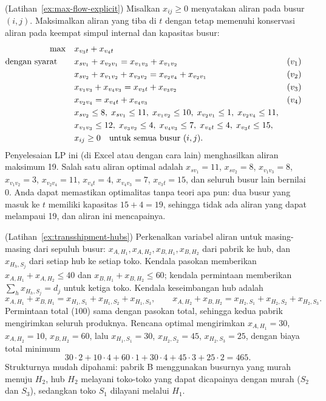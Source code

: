 \begin{solution}(Latihan~\ref{ex:max-flow-explicit})
Misalkan $x_{ij} \geq 0$ menyatakan aliran pada busur $(i,j)$. Maksimalkan aliran yang tiba di $t$ dengan tetap memenuhi konservasi aliran pada keempat simpul internal dan kapasitas busur:
\begin{align*}
\max \quad & x_{v_3 t} + x_{v_4 t}\\
\mbox{dengan syarat}\quad \quad & x_{s v_1} + x_{v_2 v_1} = x_{v_1 v_3} + x_{v_1 v_2} && (v_1)\\
& x_{s v_2} + x_{v_1 v_2} + x_{v_3 v_2} = x_{v_2 v_4} + x_{v_2 v_1} && (v_2)\\
& x_{v_1 v_3} + x_{v_4 v_3} = x_{v_3 t} + x_{v_3 v_2} && (v_3)\\
& x_{v_2 v_4} = x_{v_4 t} + x_{v_4 v_3} && (v_4)\\
& x_{s v_2} \leq 8, \; x_{s v_1} \leq 11, \; x_{v_1 v_2} \leq 10, \; x_{v_2 v_1} \leq 1, \; x_{v_2 v_4} \leq 11,\\
& x_{v_1 v_3} \leq 12, \; x_{v_3 v_2} \leq 4, \; x_{v_4 v_3} \leq 7, \; x_{v_4 t} \leq 4, \; x_{v_3 t} \leq 15,\\
& x_{ij} \geq 0 \quad \mbox{untuk semua busur } (i,j).
\end{align*}
Penyelesaian LP ini (di Excel atau dengan cara lain) menghasilkan aliran maksimum 19. Salah satu aliran optimal adalah $x_{s v_1} = 11$, $x_{s v_2} = 8$, $x_{v_1 v_3} = 8$, $x_{v_1 v_2} = 3$, $x_{v_2 v_4} = 11$, $x_{v_4 t} = 4$, $x_{v_4 v_3} = 7$, $x_{v_3 t} = 15$, dan seluruh busur lain bernilai 0. Anda dapat memastikan optimalitas tanpa teori apa pun: dua busur yang masuk ke $t$ memiliki kapasitas $15 + 4 = 19$, sehingga tidak ada aliran yang dapat melampaui 19, dan aliran ini mencapainya.
\end{solution}

\begin{solution}(Latihan~\ref{ex:transshipment-hubs})
Perkenalkan variabel aliran untuk masing-masing dari sepuluh busur: $x_{A,H_1}, x_{A,H_2}, x_{B,H_1}, x_{B,H_2}$ dari pabrik ke hub, dan $x_{H_h,S_j}$ dari setiap hub ke setiap toko. Kendala pasokan memberikan $x_{A,H_1} + x_{A,H_2} \leq 40$ dan $x_{B,H_1} + x_{B,H_2} \leq 60$; kendala permintaan memberikan $\sum_h x_{H_h,S_j} = d_j$ untuk ketiga toko. Kendala keseimbangan hub adalah
\[
x_{A,H_1} + x_{B,H_1} = x_{H_1,S_1} + x_{H_1,S_2} + x_{H_1,S_3}, \qquad
x_{A,H_2} + x_{B,H_2} = x_{H_2,S_1} + x_{H_2,S_2} + x_{H_2,S_3}.
\]
Permintaan total ($100$) sama dengan pasokan total, sehingga kedua pabrik mengirimkan seluruh produknya. Rencana optimal mengirimkan $x_{A,H_1} = 30$, $x_{A,H_2} = 10$, $x_{B,H_2} = 60$, lalu $x_{H_1,S_1} = 30$, $x_{H_2,S_2} = 45$, $x_{H_2,S_3} = 25$, dengan biaya total minimum
\[
30 \cdot 2 + 10 \cdot 4 + 60 \cdot 1 + 30 \cdot 4 + 45 \cdot 3 + 25 \cdot 2 = 465.
\]
Strukturnya mudah dipahami: pabrik B menggunakan busurnya yang murah menuju $H_2$, hub $H_2$ melayani toko-toko yang dapat dicapainya dengan murah ($S_2$ dan $S_3$), sedangkan toko $S_1$ dilayani melalui $H_1$.
\end{solution}

